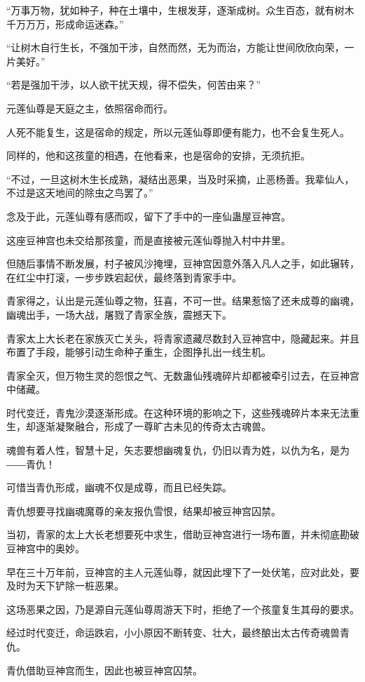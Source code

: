 \begin{this_body}
“万事万物，犹如种子，种在土壤中，生根发芽，逐渐成树。众生百态，就有树木千万万万，形成命运迷森。”

“让树木自行生长，不强加干涉，自然而然，无为而治，方能让世间欣欣向荣，一片美好。”

“若是强加干涉，以人欲干扰天规，得不偿失，何苦由来？”

元莲仙尊是天庭之主，依照宿命而行。

人死不能复生，这是宿命的规定，所以元莲仙尊即便有能力，也不会复生死人。

同样的，他和这孩童的相遇，在他看来，也是宿命的安排，无须抗拒。

“不过，一旦这树木生长成熟，凝结出恶果，当及时采摘，止恶杨善。我辈仙人，不过是这天地间的除虫之鸟罢了。”

念及于此，元莲仙尊有感而叹，留下了手中的一座仙蛊屋豆神宫。

这座豆神宫也未交给那孩童，而是直接被元莲仙尊抛入村中井里。

但随后事情不断发展，村子被风沙掩埋，豆神宫因意外落入凡人之手，如此辗转，在红尘中打滚，一步步跌宕起伏，最终落到青家手中。

青家得之，认出是元莲仙尊之物，狂喜，不可一世。结果惹恼了还未成尊的幽魂，幽魂出手，一场大战，屠戮了青家全族，震撼天下。

青家太上大长老在家族灭亡关头，将青家遗藏尽数封入豆神宫中，隐藏起来。并且布置了手段，能够引动生命种子重生，企图挣扎出一线生机。

青家全灭，但万物生灵的怨恨之气、无数蛊仙残魂碎片却都被牵引过去，在豆神宫中储藏。

时代变迁，青鬼沙漠逐渐形成。在这种环境的影响之下，这些残魂碎片本来无法重生，却逐渐凝聚融合，形成了一尊旷古未见的传奇太古魂兽。

魂兽有着人性，智慧十足，矢志要想幽魂复仇，仍旧以青为姓，以仇为名，是为――青仇！

可惜当青仇形成，幽魂不仅是成尊，而且已经失踪。

青仇想要寻找幽魂魔尊的亲友报仇雪恨，结果却被豆神宫囚禁。

当初，青家的太上大长老想要死中求生，借助豆神宫进行一场布置，并未彻底勘破豆神宫中的奥妙。

早在三十万年前，豆神宫的主人元莲仙尊，就因此埋下了一处伏笔，应对此处，要及时为天下铲除一桩恶果。

这场恶果之因，乃是源自元莲仙尊周游天下时，拒绝了一个孩童复生其母的要求。

经过时代变迁，命运跌宕，小小原因不断转变、壮大，最终酿出太古传奇魂兽青仇。

青仇借助豆神宫而生，因此也被豆神宫囚禁。


\end{this_body}
